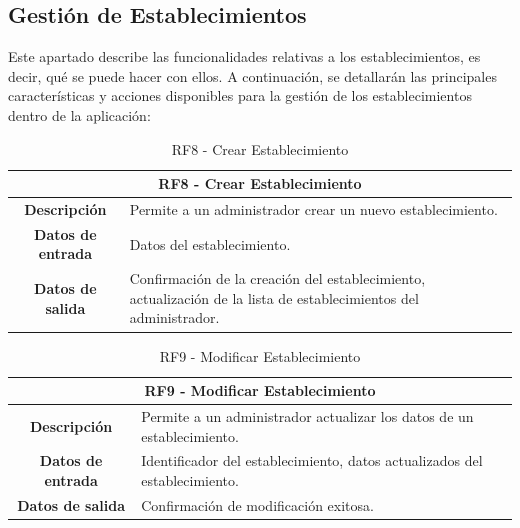 \subsection{Gestión de Establecimientos}

Este apartado describe las funcionalidades relativas a los establecimientos, es decir, qué se puede hacer con ellos. A continuación, se detallarán las principales características y acciones disponibles para la gestión de los establecimientos dentro de la aplicación:

\begin{table}[H]
    \centering
    \begin{tabular}{|c|p{10cm}|}
        \hline
        \multicolumn{2}{|c|}{\textbf{RF8 - Crear Establecimiento}}                                                                                    \\
        \hline
        \textbf{Descripción}      & Permite a un administrador crear un nuevo establecimiento.                                                        \\
        \hline
        \textbf{Datos de entrada} & Datos del establecimiento.                                                                                        \\
        \hline
        \textbf{Datos de salida}  & Confirmación de la creación del establecimiento, actualización de la lista de establecimientos del administrador. \\
        \hline
    \end{tabular}
    \caption{RF8 - Crear Establecimiento}
\end{table}

\begin{table}[H]
    \centering
    \begin{tabular}{|c|p{10cm}|}
        \hline
        \multicolumn{2}{|c|}{\textbf{RF9 - Modificar Establecimiento}}                                         \\
        \hline
        \textbf{Descripción}      & Permite a un administrador actualizar los datos de un establecimiento.     \\
        \hline
        \textbf{Datos de entrada} & Identificador del establecimiento, datos actualizados del establecimiento. \\
        \hline
        \textbf{Datos de salida}  & Confirmación de modificación exitosa.                                      \\
        \hline
    \end{tabular}
    \caption{RF9 - Modificar Establecimiento}
\end{table}


